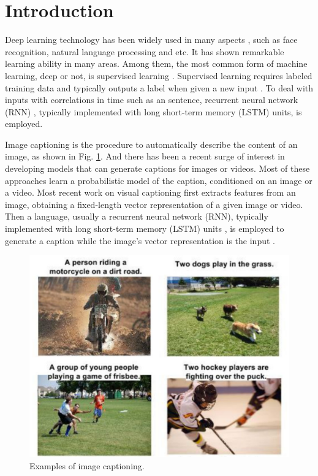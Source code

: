 \documentclass[conference]{IEEEtran}
\begin{document}
\IEEEpeerreviewmaketitle



\section{Introduction}

Deep learning technology has been widely used in many aspects \cite{krizhevsky2012imagenet}, such as face recognition, natural language processing and etc. It has shown remarkable learning ability in many areas. Among them, the most common form of machine learning, deep or not, is supervised learning \cite{lecun2015deep}. Supervised learning requires labeled training data and typically outputs a label when given a new input \cite{lecun1998gradient}. To deal with inputs with correlations in time such as an sentence, recurrent neural network (RNN) \cite{mikolov2010recurrent}, typically implemented with long short-term memory (LSTM) units, is employed.

Image captioning is the procedure to automatically describe the content of an image, as shown in Fig. \ref{cap_fig}. And there has been a recent surge of interest in developing models that can generate captions for images or videos. Most of these approaches learn a probabilistic model of the caption, conditioned on an image or a video. Most recent work on visual captioning first extracts features from an image, obtaining a fixed-length vector representation of a given image or video. Then a language, usually a recurrent neural network (RNN), typically implemented with long short-term memory (LSTM) units \cite{graves2013speech}, is employed to generate a caption while the image's vector representation is the input \cite{vinyals2015show}.

\begin{figure}
  \centering
  \includegraphics[width=1.0\linewidth]{figures/caption.pdf}
  \caption{Examples of image captioning.}\label{cap_fig}
\end{figure}
\end{document}
